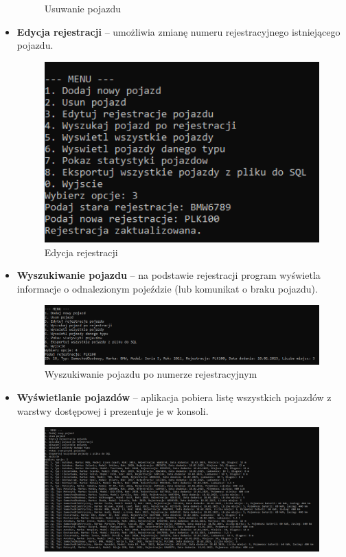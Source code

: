 \begin{itemize}
\begin{figure}[H]
        \caption{Usuwanie pojazdu}
        \label{fig:moj_obrazek}
    \end{figure}
    \item \textbf{Edycja rejestracji} -- umożliwia zmianę numeru rejestracyjnego istniejącego pojazdu.
    \begin{figure}[H] 
        \centering
        \includegraphics[width=1\textwidth]{Rejestracja.png}
        \caption{Edycja rejestracji}
        \label{fig:moj_obrazek}
    \end{figure}
    \item \textbf{Wyszukiwanie pojazdu} -- na podstawie rejestracji program wyświetla informacje 
    o odnalezionym pojeździe (lub komunikat o braku pojazdu).
    \begin{figure}[H] 
        \centering
        \includegraphics[width=1\textwidth]{WyszukiwanieRejestracja.png}
        \caption{Wyszukiwanie pojazdu po numerze rejestracyjnym}
        \label{fig:moj_obrazek}
    \end{figure}
    \item \textbf{Wyświetlanie pojazdów} -- aplikacja pobiera listę wszystkich pojazdów z warstwy dostępowej 
    i prezentuje je w konsoli.
    \begin{figure}[H] 
        \centering
        \includegraphics[width=1\textwidth]{Wyswietlanie wszyskiego.png}

\end{figure}
\end{itemize}
